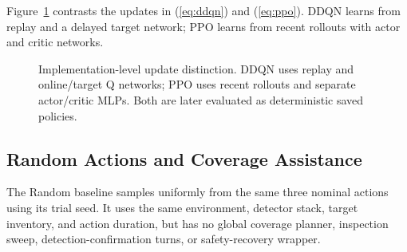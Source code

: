 \documentclass[conference]{IEEEtran}
\begin{document}
Figure~\ref{fig:rlcompare} contrasts the updates in (\ref{eq:ddqn}) and (\ref{eq:ppo}). DDQN learns from replay and a delayed target network; PPO learns from recent rollouts with actor and critic networks.

\begin{figure}[t]
\centering
{}
\caption{Implementation-level update distinction. DDQN uses replay and online/target Q networks; PPO uses recent rollouts and separate actor/critic MLPs. Both are later evaluated as deterministic saved policies.}
\label{fig:rlcompare}
\end{figure}

\subsection{Random Actions and Coverage Assistance}
The Random baseline samples uniformly from the same three nominal actions using its trial seed. It uses the same environment, detector stack, target inventory, and action duration, but has no global coverage planner, inspection sweep, detection-confirmation turns, or safety-recovery wrapper.
\end{document}
